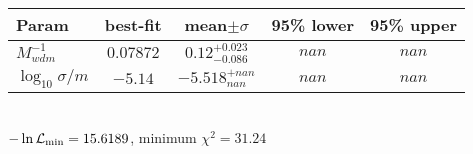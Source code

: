 \begin{tabular}{|l|c|c|c|c|} 
 \hline 
Param & best-fit & mean$\pm\sigma$ & 95\% lower & 95\% upper \\ \hline 
$M_{wdm}^{-1}$ &$0.07872$ & $0.12_{-0.086}^{+0.023}$ & $nan$ & $nan$ \\ 
$\log_{10}{\sigma / m}$ &$-5.14$ & $-5.518_{nan}^{+nan}$ & $nan$ & $nan$ \\ 
\hline 
 \end{tabular} \\ 
$-\ln{\cal L}_\mathrm{min} =15.6189$, minimum $\chi^2=31.24$ \\ 
